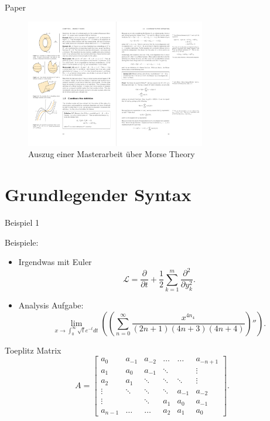 \documentclass{beamer}
\begin{document}
\begin{frame}{Paper}
    \begin{figure}[htpb]
        \centering
        \includegraphics[width=0.7\textwidth]{./figs/example-paper.png}
        \caption{Auszug einer Masterarbeit \"uber Morse Theory}
    \end{figure}
\end{frame}



\section{Grundlegender Syntax}
\begin{frame}{Beispiel 1}


Beispiele:
\begin{itemize}
    \item Irgendwas mit Euler \cite{baranek2023randomized}
        \[ \mathcal{L} = \frac{\partial}{\partial t}+ \frac{1}{2}\sum_{k=1}^{m}\frac{\partial^2}{\partial y_{k}^2} .\] 
\end{itemize}


\begin{itemize}
    \item Analysis Aufgabe: 
        \[ \lim_{x\to \int_0^{\infty} \sqrt{t}e^{-t}dt}\left( \left( \sum_{n=0}^{\infty}\frac{x^{4n_4}}{(2n+1)(4n+3)(4n+4)} \right)''  \right) .\] 
\end{itemize}
\end{frame}

    



\begin{frame}
    Toeplitz Matrix
    \[ A=\begin{bmatrix}
            a_0 & a_{-1} & a_{-2} & \ldots & \ldots  &a_{-n+1}  \\
            a_1 & a_0  & a_{-1} &  \ddots   &  &  \vdots \\
            a_2 & a_1 & \ddots  & \ddots & \ddots& \vdots \\ 
            \vdots &  \ddots & \ddots &   \ddots  & a_{-1} & a_{-2}\\
            \vdots &         & \ddots & a_1 & a_0 &  a_{-1} \\
            a_{n-1} &  \ldots & \ldots & a_2 & a_1 & a_0
        \end{bmatrix} .\] 
\end{frame}
\end{document}
